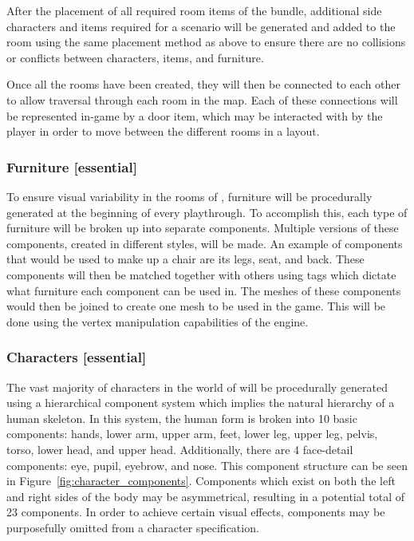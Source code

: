 \documentclass{GlobalDocument}
\begin{document}
After the placement of all required room items of the bundle, additional side characters and items required for a scenario will be generated and added to the room using the same placement method as above to ensure there are no collisions or conflicts between characters, items, and furniture.

Once all the rooms have been created, they will then be connected to each other to allow traversal through each room in the map. Each of these connections will be represented in-game by a door item, which may be interacted with by the player in order to move between the different rooms in a layout.

\subsubsection{Furniture [essential]}
\label{sec:furniture_generation}
To ensure visual variability in the rooms of \ourgame, furniture will be procedurally generated at the beginning of every playthrough. To accomplish this, each type of furniture will be broken up into separate components. Multiple versions of these components, created in different styles, will be made. An example of components that would be used to make up a chair are its legs, seat, and back. These components will then be matched together with others using tags which dictate what furniture each component can be used in. The meshes of these components would then be joined to create one mesh to be used in the game. This will be done using the vertex manipulation capabilities of the engine.

\subsubsection{Characters [essential]}
\label{sec:character_generation}
The vast majority of characters in the world of \ourgame{} will be procedurally generated using a hierarchical component system which implies the natural hierarchy of a human skeleton. In this system, the human form is broken into 10 basic components: hands, lower arm, upper arm, feet, lower leg, upper leg, pelvis, torso, lower head, and upper head. Additionally, there are 4 face-detail components: eye, pupil, eyebrow, and nose. This component structure can be seen in Figure~\ref{fig:character_components}. Components which exist on both the left and right sides of the body may be asymmetrical, resulting in a potential total of 23 components. In order to achieve certain visual effects, components may be purposefully omitted from a character specification.
\end{document}
